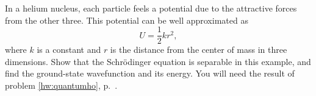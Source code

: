 In a helium nucleus, each particle feels a potential due to the attractive
forces from the other three. This potential can be well approximated as
\begin{equation*}
  U = \frac{1}{2}kr^2,
\end{equation*}
where $k$ is a constant and $r$ is the distance from the center of mass in three dimensions.
Show that the Schr\"odinger equation is separable in this example, and
find the ground-state wavefunction and its energy. You will need the result of problem
\ref{hw:quantumho}, p.~\pageref{hw:quantumho}.
